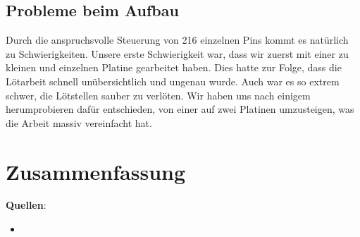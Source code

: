 \documentclass[12pt,a4paper]{article}
\begin{document}
\subsection{Probleme beim Aufbau}

Durch die anspruchsvolle Steuerung von 216 einzelnen Pins kommt es natürlich zu Schwierigkeiten. Unsere erste Schwierigkeit war, dass wir zuerst mit einer zu kleinen und einzelnen Platine gearbeitet haben. Dies hatte zur Folge, dass die Lötarbeit schnell unübersichtlich und ungenau wurde. Auch war es so extrem schwer, die Lötstellen sauber zu verlöten. Wir haben uns nach einigem herumprobieren dafür entschieden, von einer auf zwei Platinen umzusteigen, was die Arbeit massiv vereinfacht hat.

\section{Zusammenfassung}

\newpage

\textbf{Quellen}:

\begin{itemize}
    \item 
\end{itemize}
\end{document}
